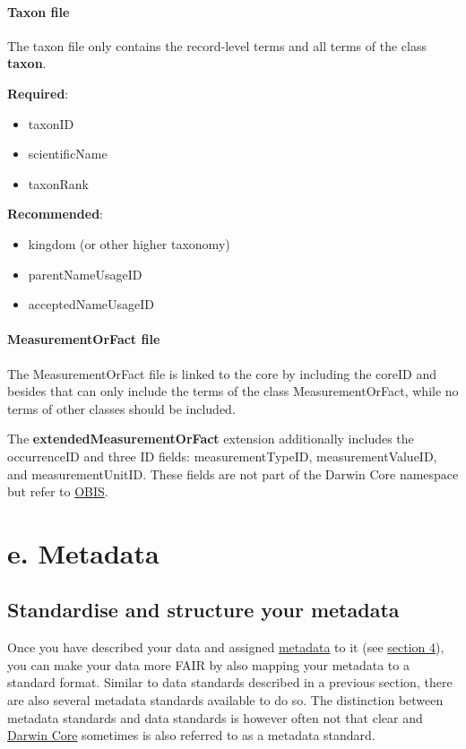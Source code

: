 \documentclass[
  oneside]{book}
\begin{document}
\subsection{Taxon file}\label{taxon-file}

The taxon file only contains the record-level terms and all terms of the class \textbf{taxon}.

\textbf{Required}:

\begin{itemize}
\item
  taxonID
\item
  scientificName
\item
  taxonRank
\end{itemize}

\textbf{Recommended}:

\begin{itemize}
\item
  kingdom {(or other higher taxonomy)}
\item
  parentNameUsageID
\item
  acceptedNameUsageID
\end{itemize}

\subsection{MeasurementOrFact file}\label{measurementorfact-file}

The MeasurementOrFact file is linked to the core by including the coreID and besides that can only include the terms of the class MeasurementOrFact, while no terms of other classes should be included.

The \textbf{extendedMeasurementOrFact} extension additionally includes the occurrenceID and three ID fields: measurementTypeID, measurementValueID, and measurementUnitID. These fields are not part of the Darwin Core namespace but refer to \hyperref[OBIS]{OBIS}.

\part*{e. Metadata}\label{part-e.-metadata}

\chapter{Standardise and structure your metadata}\label{standardise-and-structure-your-metadata}

Once you have described your data and assigned \hyperref[metadata]{metadata} to it (see \hyperref[describe-data]{section 4}), you can make your data more FAIR by also mapping your metadata to a standard format. Similar to data standards described in a previous section, there are also several metadata standards available to do so. The distinction between metadata standards and data standards is however often not that clear and \hyperref[DwC]{Darwin Core} sometimes is also referred to as a metadata standard.
\end{document}
